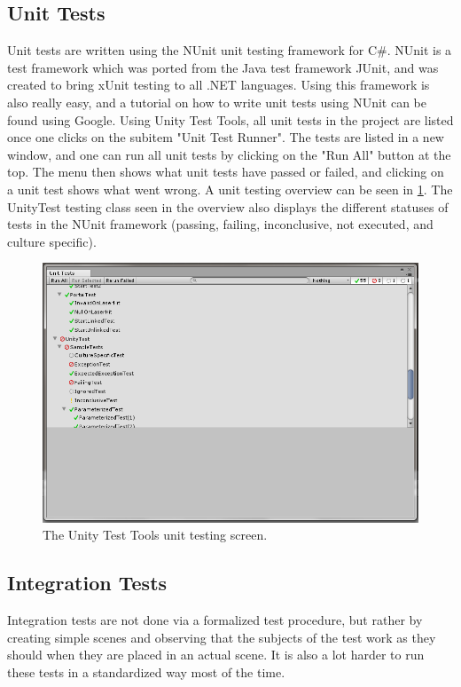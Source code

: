 		\subsection{Unit Tests} \label{ssec:unittests)}
			Unit tests are written using the NUnit unit testing framework for 
			C\#. NUnit is a test framework which was ported from the Java test 
			framework JUnit, and was created to bring xUnit testing to all .NET 
			languages. Using this framework is also really easy, and a tutorial 
			on how to write unit tests using NUnit can be found using Google. 
			Using Unity Test Tools, all unit tests in the project are listed 
			once one clicks on the subitem "Unit Test Runner". The tests are 
			listed in a new window, and one can run all unit tests by clicking 
			on the "Run All" button at the top. The menu then shows what unit 
			tests have passed or failed, and clicking on a unit test shows what 
			went wrong. A unit testing overview can be seen in \ref{fig:unitytesttools}.
			The UnityTest testing class seen in the overview also displays
			the different statuses of tests in the NUnit framework (passing,
			failing, inconclusive, not executed, and culture specific).
			
			\begin{figure}[!ht]
				\centering
				\includegraphics[width=\textwidth]{UnityTestTools}
				\caption{The Unity Test Tools unit testing screen.}
				\label{fig:unitytesttools}
			\end{figure}
		
		\subsection{Integration Tests} \label{ssec:integrationtests}
			Integration tests are not done via a formalized test procedure, but 
			rather by creating simple scenes and observing that the subjects of 
			the test work as they should when they are placed in an actual 
			scene. It is also a lot harder to run these tests in a standardized 
			way most of the time. 
		
